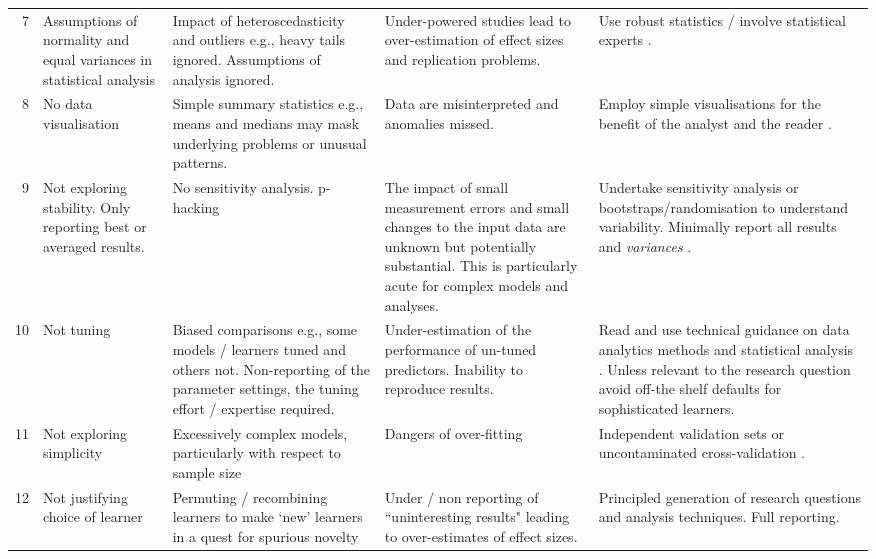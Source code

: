 \documentclass[10pt]{elsarticle}
\begin{document}
\begin{table}
{\begin{tabular}{|r|p{1.2cm}|p{3cm}|p{2.7cm}|p{3.5cm}|}
7  & Assumptions of normality and equal variances in statistical analysis & Impact of heteroscedasticity and outliers e.g., heavy tails ignored.  Assumptions of analysis ignored.  & Under-powered studies lead to over-estimation of effect sizes and replication problems. & Use robust statistics / involve statistical experts \cite{Kitc02,Wilc12}.\\
\rowcolor{blue!10}8 & No data \newline visualisation & Simple summary statistics e.g., means and medians may mask underlying problems or unusual patterns. & Data are misinterpreted and anomalies missed. & Employ simple visualisations for the benefit of the analyst and the reader \cite{Mya09,Heal18}.\\
9 & Not exploring stability.  Only reporting best or averaged results. & No sensitivity analysis. p-hacking & The impact of small measurement errors and small changes to the input data are unknown but potentially substantial.  This is particularly acute for complex models and analyses. & Undertake sensitivity analysis or bootstraps/randomisation to understand variability. Minimally report all results and \textit{variances} \cite{Manl97,Salt00}.\\
\rowcolor{blue!10}
10 & Not tuning & Biased comparisons e.g., some models / learners tuned and others not. Non-reporting of the parameter settings, the tuning effort / expertise required. & Under-estimation of the performance of un-tuned predictors. Inability to reproduce results. & Read and use technical guidance on data analytics methods and statistical analysis \cite{Snoe12,fu2016}.  Unless relevant to the research question avoid off-the shelf defaults for sophisticated learners.\\
11 & Not exploring simplicity & Excessively complex models, particularly with respect to sample size  & Dangers of over-fitting & Independent validation sets or uncontaminated cross-validation \cite{Cawl10}. \\
\rowcolor{blue!10} 
  12 & Not justifying choice of learner & Permuting / recombining learners to make `new' learners in a quest for spurious novelty & Under / non reporting of ``uninteresting results" leading to over-estimates of effect sizes. & Principled generation of research questions and analysis techniques. Full reporting. \\
\hline

\end{tabular} 
}
\label{Tab:BadSmells}
\end{table}%
\end{document}
